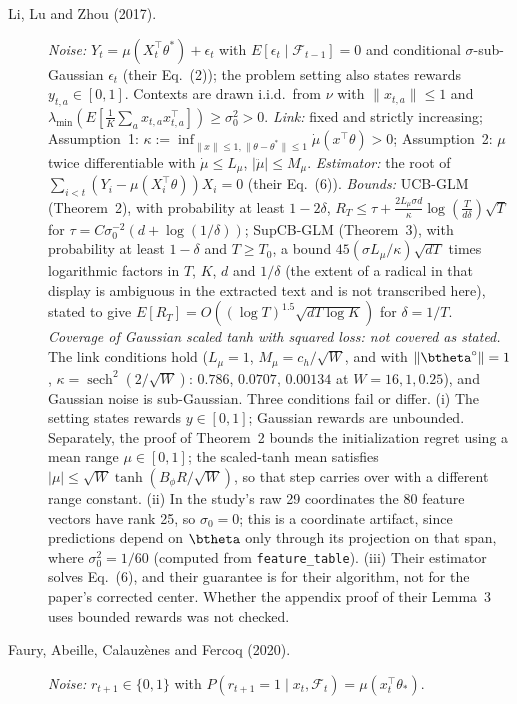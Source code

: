 \begin{description}
\item[Li, Lu and Zhou (2017).]
\emph{Noise:} $Y_t=\mu(X_t^\top\theta^*)+\epsilon_t$ with
$E[\epsilon_t\mid\mathcal F_{t-1}]=0$ and conditional $\sigma$-sub-Gaussian
$\epsilon_t$ (their Eq.~(2)); the problem setting also states rewards
$y_{t,a}\in[0,1]$. Contexts are drawn i.i.d.\ from $\nu$ with $\|x_{t,a}\|\le1$
and $\lambda_{\min}(E[\frac1K\sum_a x_{t,a}x_{t,a}^\top])\ge\sigma_0^2>0$.
\emph{Link:} fixed and strictly increasing; Assumption~1:
$\kappa:=\inf_{\|x\|\le1,\|\theta-\theta^*\|\le1}\dot\mu(x^\top\theta)>0$;
Assumption~2: $\mu$ twice differentiable with $\dot\mu\le L_\mu$,
$|\ddot\mu|\le M_\mu$. \emph{Estimator:} the root of
$\sum_{i<t}(Y_i-\mu(X_i^\top\theta))X_i=0$ (their Eq.~(6)).
\emph{Bounds:} UCB-GLM (Theorem~2), with probability at least $1-2\delta$,
$R_T\le\tau+\frac{2L_\mu\sigma d}{\kappa}\log(\frac{T}{d\delta})\sqrt T$ for
$\tau=C\sigma_0^{-2}(d+\log(1/\delta))$; SupCB-GLM (Theorem~3), with probability
at least $1-\delta$ and $T\ge T_0$, a bound $45(\sigma L_\mu/\kappa)\sqrt{dT}$
times logarithmic factors in $T$, $K$, $d$ and $1/\delta$ (the extent of a
radical in that display is ambiguous in the extracted text and is not
transcribed here), stated to give
$E[R_T]=O((\log T)^{1.5}\sqrt{dT\log K})$ for $\delta=1/T$.
\emph{Coverage of Gaussian scaled tanh with squared loss: not covered as stated.}
The link conditions hold ($L_\mu=1$, $M_\mu=c_h/\sqrt W$, and with
$\|\btheta^\circ\|=1$, $\kappa=\operatorname{sech}^2(2/\sqrt W)$: $0.786$,
$0.0707$, $0.00134$ at $W=16,1,0.25$), and Gaussian noise is sub-Gaussian.
Three conditions fail or differ. (i) The setting states rewards
$y\in[0,1]$; Gaussian rewards are unbounded. Separately, the proof of
Theorem~2 bounds the initialization regret using a mean range $\mu\in[0,1]$;
the scaled-tanh mean satisfies $|\mu|\le\sqrt W\tanh(B_\phi R/\sqrt W)$, so that
step carries over with a different range constant. (ii) In the study's raw 29
coordinates the 80 feature vectors have rank 25, so $\sigma_0=0$; this is a
coordinate artifact, since predictions depend on $\btheta$ only through its
projection on that span, where $\sigma_0^2=1/60$ (computed from
\texttt{feature\_table}). (iii) Their estimator solves Eq.~(6), and their
guarantee is for their algorithm, not for the paper's corrected center. Whether the appendix proof of
their Lemma~3 uses bounded rewards was not checked.
\item[Faury, Abeille, Calauz\`enes and Fercoq (2020).]
\emph{Noise:} $r_{t+1}\in\{0,1\}$ with $P(r_{t+1}=1\mid x_t,\mathcal F_t)=\mu(x_t^\top\theta_*)$.

\end{description}
